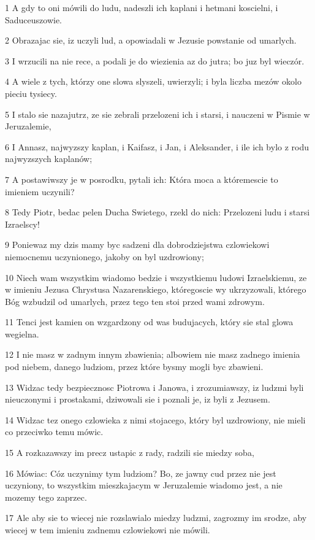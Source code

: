\par 1 A gdy to oni mówili do ludu, nadeszli ich kaplani i hetmani koscielni, i Saduceuszowie.
\par 2 Obrazajac sie, iz uczyli lud, a opowiadali w Jezusie powstanie od umarlych.
\par 3 I wrzucili na nie rece, a podali je do wiezienia az do jutra; bo juz byl wieczór.
\par 4 A wiele z tych, którzy one slowa slyszeli, uwierzyli; i byla liczba mezów okolo pieciu tysiecy.
\par 5 I stalo sie nazajutrz, ze sie zebrali przelozeni ich i starsi, i nauczeni w Pismie w Jeruzalemie,
\par 6 I Annasz, najwyzszy kaplan, i Kaifasz, i Jan, i Aleksander, i ile ich bylo z rodu najwyzszych kaplanów;
\par 7 A postawiwszy je w posrodku, pytali ich: Która moca a któremescie to imieniem uczynili?
\par 8 Tedy Piotr, bedac pelen Ducha Swietego, rzekl do nich: Przelozeni ludu i starsi Izraelscy!
\par 9 Poniewaz my dzis mamy byc sadzeni dla dobrodziejstwa czlowiekowi niemocnemu uczynionego, jakoby on byl uzdrowiony;
\par 10 Niech wam wszystkim wiadomo bedzie i wszystkiemu ludowi Izraelskiemu, ze w imieniu Jezusa Chrystusa Nazarenskiego, któregoscie wy ukrzyzowali, którego Bóg wzbudzil od umarlych, przez tego ten stoi przed wami zdrowym.
\par 11 Tenci jest kamien on wzgardzony od was budujacych, który sie stal glowa wegielna.
\par 12 I nie masz w zadnym innym zbawienia; albowiem nie masz zadnego imienia pod niebem, danego ludziom, przez które bysmy mogli byc zbawieni.
\par 13 Widzac tedy bezpiecznosc Piotrowa i Janowa, i zrozumiawszy, iz ludzmi byli nieuczonymi i prostakami, dziwowali sie i poznali je, iz byli z Jezusem.
\par 14 Widzac tez onego czlowieka z nimi stojacego, który byl uzdrowiony, nie mieli co przeciwko temu mówic.
\par 15 A rozkazawszy im precz ustapic z rady, radzili sie miedzy soba,
\par 16 Mówiac: Cóz uczynimy tym ludziom? Bo, ze jawny cud przez nie jest uczyniony, to wszystkim mieszkajacym w Jeruzalemie wiadomo jest, a nie mozemy tego zaprzec.
\par 17 Ale aby sie to wiecej nie rozslawialo miedzy ludzmi, zagrozmy im srodze, aby wiecej w tem imieniu zadnemu czlowiekowi nie mówili.
